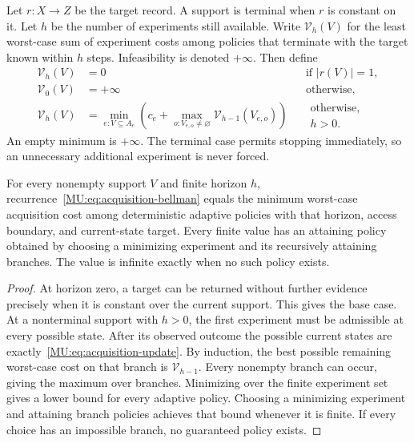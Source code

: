 Let $r:X\to Z$ be the target record. A support is terminal when $r$ is constant on it. Let $h$ be the number of experiments still available. Write $\mathcal V_h(V)$ for the least worst-case sum of experiment costs among policies that terminate with the target known within $h$ steps. Infeasibility is denoted $+\infty$. Then define
\begin{equation}\label{MU:eq:acquisition-bellman}
\begin{aligned}
\mathcal V_h(V)&=0 &&\text{if }|r(V)|=1,\\
\mathcal V_0(V)&=+\infty &&\text{otherwise},\\
\mathcal V_h(V)&=\min_{e:V\subseteq A_e}
\left(c_e+\max_{o:V_{e,o}\ne\varnothing}\mathcal V_{h-1}(V_{e,o})\right)
&&\substack{\text{otherwise,}\\h>0.}
\end{aligned}
\end{equation}
An empty minimum is $+\infty$. The terminal case permits stopping immediately, so an unnecessary additional experiment is never forced.

\begin{MUtheorem}\label{MU:thm:acquisition}
For every nonempty support $V$ and finite horizon $h$, recurrence~\eqref{MU:eq:acquisition-bellman} equals the minimum worst-case acquisition cost among deterministic adaptive policies with that horizon, access boundary, and current-state target. Every finite value has an attaining policy obtained by choosing a minimizing experiment and its recursively attaining branches. The value is infinite exactly when no such policy exists.
\end{MUtheorem}
\begin{proof}
At horizon zero, a target can be returned without further evidence precisely when it is constant over the current support. This gives the base case. At a nonterminal support with $h>0$, the first experiment must be admissible at every possible state. After its observed outcome the possible current states are exactly~\eqref{MU:eq:acquisition-update}. By induction, the best possible remaining worst-case cost on that branch is $\mathcal V_{h-1}$. Every nonempty branch can occur, giving the maximum over branches. Minimizing over the finite experiment set gives a lower bound for every adaptive policy. Choosing a minimizing experiment and attaining branch policies achieves that bound whenever it is finite. If every choice has an impossible branch, no guaranteed policy exists.
\end{proof}

